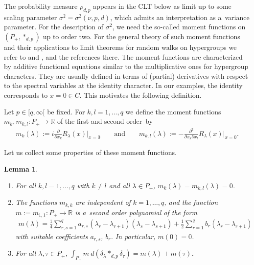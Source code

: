 \documentclass[pdftex]{sigma}
\numberwithin{equation}{section}
\newtheorem{Lemma}[Theorem]{Lemma}
\begin{document}
The probability measure $\rho_{d,p}$ appears in the CLT below as limit up to some scaling parameter
$\sigma^2=\sigma^2(\nu,p,d)$, which admits an interpretation as a~variance parameter.
For the description of $\sigma^2$, we need the so-called moment functions on $(P_+,*_{d,p})$ up to order two.
For the general theory of such moment functions and their applications to limit theorems for random walks on hypergroups
we refer to \cite[Chapter~7]{BH} and \cite{Z}, and the references there.
The moment functions are characterized by additive functional equations similar to the multiplicative ones for
hypergroup characters.
They are usually def\/ined in terms of (partial) derivatives with respect to the spectral variables at the identity
character.
In our examples, the identity corresponds to $x=0\in C$.
This motivates the following def\/inition.

\begin{Definition}
Let $p\in[q,\infty[$ be f\/ixed.
For $k,l=1,\ldots,q$ we def\/ine the moment functions $m_k, m_{k,l}: P_+\to\mathbb R$ of the f\/irst and second order~by
\begin{gather*}
m_k(\lambda):= i  \frac{\partial}{\partial x_k} R_\lambda(x)\bigg|_{x=0}
\qquad
\text{and}
\qquad
m_{k,l}(\lambda):= -\frac{\partial^2}{\partial x_k\partial x_l} R_\lambda(x)\bigg|_{x=0}.
\end{gather*}
\end{Definition}

\noindent Let us collect some properties of these moment functions.

\begin{Lemma}\label{basic-prop-moment}\quad
\begin{enumerate}\itemsep=0pt
\item[$(1)$]
For all $k,l=1,\ldots,q$ with $k\ne l$ and all $\lambda\in P_+$, $m_k(\lambda)= m_{k,l}(\lambda)=0$.
\item[$(2)$]
The functions $m_{k,k}$ are independent of $k=1,\ldots,q$, and the function $m:=m_{1,1}: P_+\to\mathbb
R$ is a~second order polynomial of the form
\begin{gather*}
m(\lambda)
=\frac{1}{4}\sum\limits_{r,s=1}^q a_{r,s}
 (\lambda_r-\lambda_{r+1})(\lambda_s-\lambda_{s+1}) +\frac{1}{2} \sum\limits_{r=1}^q b_r (\lambda_r-\lambda_{r+1})
\end{gather*}
with suitable coefficients $a_{r,s}$, $b_r$.
In particular, $m(0)=0$.
\item[$(3)$]
For all $\lambda,\tau\in P_+$, $\int_{P_+} m\> d(\delta_\lambda*_{d,p}\delta_\tau)= m(\lambda)+m(\tau)$.
\end{enumerate}
\end{Lemma}
\end{document}
